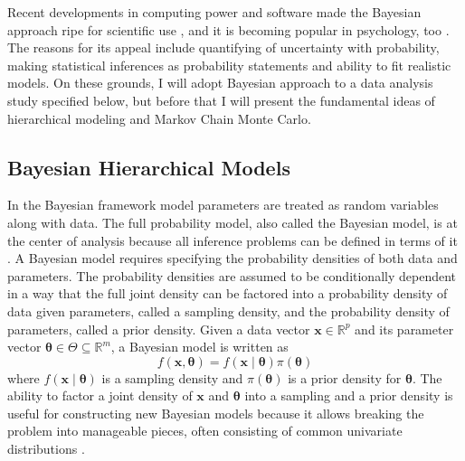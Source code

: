 \documentclass[12pt]{report}
\begin{document}
Recent developments in computing power and software made the Bayesian approach ripe for
scientific use \citep{Kru2010}, and it is becoming popular in psychology, too
\citep{EdwLin1963,MyuPit1997,PerVan2002,RouLu2005,RouLu22005,MyuKar2008,CraPer2010,VanTue2011,LeeWag2014}. The
reasons for its appeal include quantifying of uncertainty with
probability, making statistical inferences as probability statements and ability to fit realistic models. On these grounds, I will adopt Bayesian approach to a data analysis study specified below, but before that I will present the fundamental ideas of hierarchical modeling and Markov Chain Monte Carlo.

\subsection{Bayesian Hierarchical Models}		

In the Bayesian framework model parameters are treated as random variables
along with data. The full probability model, also called the Bayesian
model, is at the center of analysis because all inference problems can be defined in terms of it
\citep{GelCar2013}. A Bayesian model requires specifying
the probability densities of both data and
parameters. The probability densities are assumed to be conditionally dependent in a way that the full joint density can
be factored into a probability density of data given parameters,
called a sampling density, and the probability density of parameters,
called a prior density. Given a data vector $\boldsymbol{x} \in \mathbb{R}^p$ and
its parameter vector $\boldsymbol{\theta} \in \Theta \subseteq
\mathbb{R}^m$, a Bayesian model is written as
%
\begin{equation}
\label{eqn:bayesmodel}
f(\boldsymbol{x}, \boldsymbol{\theta}) =
      f(\boldsymbol{x} \mid \boldsymbol{\theta})\pi(\boldsymbol{\theta}) 
\end{equation} 
%
where $f(\boldsymbol{x} \mid \boldsymbol{\theta})$ is a sampling density and $\pi(\boldsymbol{\theta})$ is a prior density for
$\boldsymbol{\theta}$. The ability to factor a joint density of
$\boldsymbol{x}$ and $\boldsymbol{\theta}$ into a sampling and a prior density is
useful for constructing new Bayesian models because it allows breaking
the problem into manageable pieces, often consisting of common
univariate distributions \citep{JohKot1994,JohKot1995}.
\end{document}
